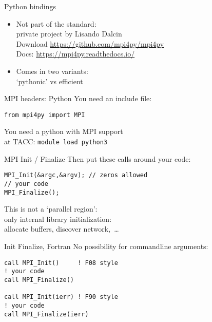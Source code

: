 \begin{python}
  \addtocounter{slidecount}{-2}
\begin{numberedframe}{Python bindings}
    \begin{itemize}
    \item Not part of the standard:\\
      private project by Lisando Dalcin\\
      Download \url{https://github.com/mpi4py/mpi4py}\\
      Docs: \url{https://mpi4py.readthedocs.io/}
    \item Comes in two variants:\\
      `pythonic' vs efficient
    \end{itemize}
\end{numberedframe}

\begin{numberedframe}{MPI headers: Python}
    \label{sl:mpi-header-p}
    You need an include file:
\begin{verbatim}
from mpi4py import MPI
\end{verbatim}
You need a python with MPI support\\
at TACC: \texttt{module load python3}
\end{numberedframe}
\end{python}

\begin{numberedframe}{MPI Init / Finalize}
Then put these calls around your code:
\lstset{language=C}
\begin{lstlisting}
MPI_Init(&argc,&argv); // zeros allowed
// your code
MPI_Finalize();  
\end{lstlisting}
This is not a `parallel region':\\
only internal library initialization:\\
allocate buffers, discover network,~\ldots
\end{numberedframe}

\begin{fortran}
  \addtocounter{slidecount}{-1}
\begin{numberedframe}{Init Finalize, Fortran}
No possibility for commandline arguments:
\lstset{language=Fortran}
\begin{lstlisting}
call MPI_Init()     ! F08 style
! your code
call MPI_Finalize()

call MPI_Init(ierr) ! F90 style
! your code
call MPI_Finalize(ierr)
\end{lstlisting}  
\end{numberedframe}
\end{fortran}

